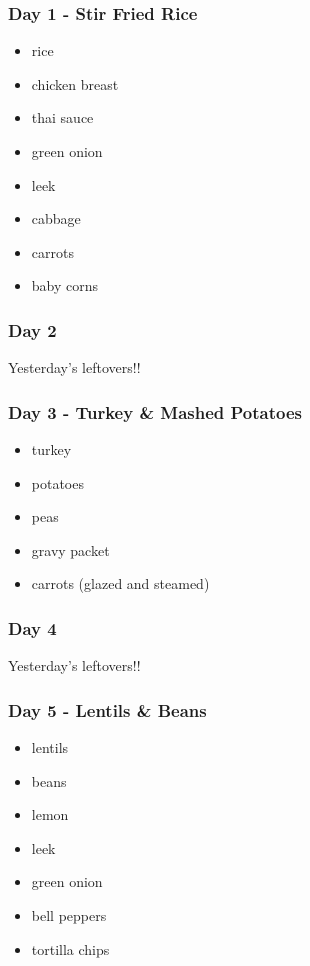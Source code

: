 \documentclass[11pt, a4paper]{article}
\begin{document}
\subsubsection{Day 1 - Stir Fried Rice}
\vspace{1pc}
\begin{itemize}
\item rice
\item chicken breast
\item thai sauce
\item green onion
\item leek
\item cabbage
\item carrots
\item baby corns
\end{itemize}

\subsubsection{Day 2}
\vspace{1pc}
Yesterday's leftovers!!

\subsubsection{Day 3 - Turkey \& Mashed Potatoes}
\vspace{1pc}
\begin{itemize}
\item turkey
\item potatoes
\item peas
\item gravy packet
\item carrots (glazed and steamed)
\end{itemize}

\subsubsection{Day 4}
\vspace{1pc}
Yesterday's leftovers!!

\subsubsection{Day 5 - Lentils \& Beans}
\vspace{1pc}
\begin{itemize}
\item lentils
\item beans
\item lemon
\item leek
\item green onion
\item bell peppers
\item tortilla chips
\end{itemize}
\end{document}
